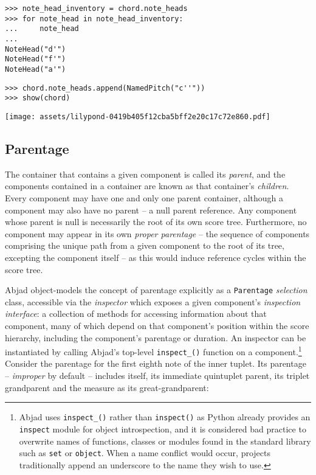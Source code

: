 \begin{comment}
<abjad>
note_head_inventory = chord.note_heads
for note_head in note_head_inventory:
    note_head

chord.note_heads.append(NamedPitch("c''"))
show(chord)
</abjad>
\end{comment}

\begin{abjadbookoutput}
\begin{singlespacing}
\vspace{-0.5\baselineskip}
\begin{lstlisting}
>>> note_head_inventory = chord.note_heads
>>> for note_head in note_head_inventory:
...     note_head
...
NoteHead("d'")
NoteHead("f'")
NoteHead("a'")
\end{lstlisting}
\begin{lstlisting}
>>> chord.note_heads.append(NamedPitch("c''"))
>>> show(chord)
\end{lstlisting}
\noindent\texttt{[image: assets/lilypond-0419b405f12cba5bff2e20c17c72e860.pdf]}
\end{singlespacing}
\end{abjadbookoutput}

\subsection{Parentage}

The container that contains a given component is called its \emph{parent}, and
the components contained in a container are known as that container's
\emph{children}. Every component may have one and only one parent container,
although a component may also have no parent -- a null parent reference. Any
component whose parent is null is necessarily the root of its own score tree.
Furthermore, no component may appear in its own \emph{proper parentage} -- the
sequence of components comprising the unique path from a given component to the
root of its tree, excepting the component itself -- as this would induce
reference cycles within the score tree.

Abjad object-models the concept of parentage explicitly as a \texttt{Parentage}
\emph{selection} class, accessible via the \emph{inspector} which exposes a
given component's \emph{inspection interface}: a collection of methods for
accessing information about that component, many of which depend on that
component's position within the score hierarchy, including the component's
parentage or duration. An inspector can be instantiated by calling Abjad's
top-level \texttt{inspect\_()} function on a component.\footnote{Abjad uses
\texttt{inspect\_()} rather than \texttt{inspect()} as Python already provides
an \texttt{inspect} module for object introspection, and it is considered bad
practice to overwrite names of functions, classes or modules found in the
standard library such as \texttt{set} or \texttt{object}. When a name conflict
would occur, projects traditionally append an underscore to the name they wish
to use.} Consider the parentage for the first eighth note of the inner tuplet.
Its parentage -- \emph{improper} by default -- includes itself, its immediate
quintuplet parent, its triplet grandparent and the  measure as its
great-grandparent:

